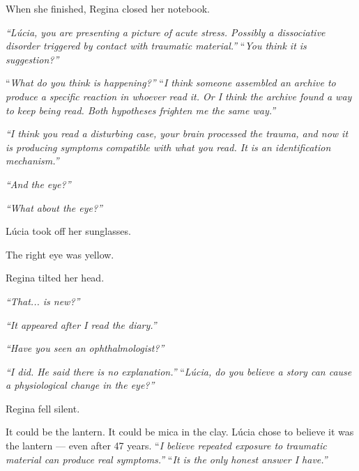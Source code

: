 \noindent When she finished, Regina closed her notebook.

\noindent \textit{\textquotedblleft{}Lúcia, you are presenting a picture of acute stress. Possibly a dissociative disorder triggered by contact with traumatic material.\textquotedblright{}}
\noindent \textquotedblleft{\textit{You think it is suggestion?\textquotedblright{}}}

\noindent \textquotedblleft{\textit{What do you think is happening?\textquotedblright{}}}
\noindent \textquotedblleft{\textit{I think someone assembled an archive to produce a specific reaction in whoever read it. Or I think the archive found a way to keep being read. Both hypotheses frighten me the same way.\textquotedblright{}}}

\noindent \textit{\textquotedblleft{}I think you read a disturbing case, your brain processed the trauma, and now it is producing symptoms compatible with what you read. It is an identification mechanism.\textquotedblright{}}

\noindent \textit{\textquotedblleft{}And the eye?\textquotedblright{}}

\noindent \textit{\textquotedblleft{}What about the eye?\textquotedblright{}}

\noindent Lúcia took off her sunglasses.

\noindent The right eye was yellow.

\noindent Regina tilted her head.

\noindent \textit{\textquotedblleft{}That... is new?\textquotedblright{}}

\noindent \textit{\textquotedblleft{}It appeared after I read the diary.\textquotedblright{}}

\noindent \textit{\textquotedblleft{}Have you seen an ophthalmologist?\textquotedblright{}}

\noindent \textit{\textquotedblleft{}I did. He said there is no explanation.\textquotedblright{}}
\noindent \textquotedblleft{\textit{Lúcia, do you believe a story can cause a physiological change in the eye?\textquotedblright{}}}

\noindent Regina fell silent.

\noindent It could be the lantern. It could be mica in the clay.
\noindent Lúcia chose to believe it was the lantern --- even after 47 years.
\noindent \textquotedblleft{\textit{I believe repeated exposure to traumatic material can produce real symptoms.\textquotedblright{}}}
\noindent \textquotedblleft{\textit{It is the only honest answer I have.\textquotedblright{}}}

